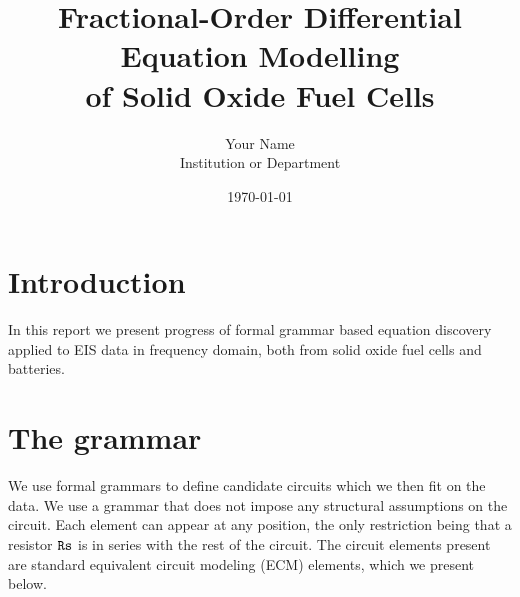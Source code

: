 \documentclass[
    11pt,
    a4paper,
    oneside
]{article}
\title{
    \textbf{Fractional-Order Differential Equation Modelling\\
    of Solid Oxide Fuel Cells}
}
\author{
    Your Name\\
    \small Institution or Department
}
\date{\today}
\newcommand{\term}[1]{\text{\texttt{#1}}}
\begin{document}
\section{Introduction}

In this report we present progress of formal grammar based equation discovery applied to EIS data in frequency domain,
both from solid oxide fuel cells and batteries.

%

\section{The grammar}

We use formal grammars to define candidate circuits which we then fit on the data. We use a grammar that does not impose any structural
assumptions on the circuit. Each element can appear at any position, the only restriction being that a resistor $\term{Rs}$ is in series
with the rest of the circuit. The circuit elements present are standard equivalent circuit modeling (ECM) elements, which we present below.

%

\end{document}
